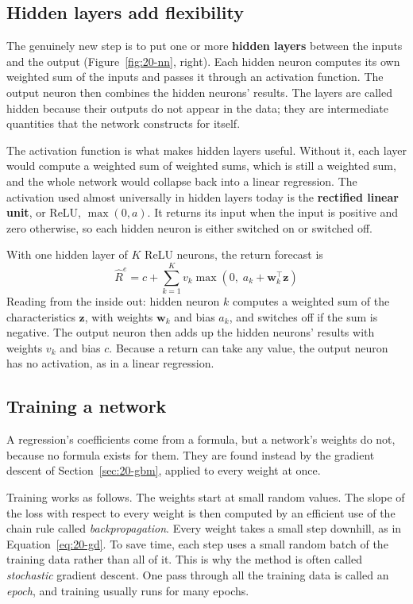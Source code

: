 \subsection{Hidden layers add flexibility}

The genuinely new step is to put one or more \textbf{hidden layers} between the inputs and the output (Figure~\ref{fig:20-nn}, right). Each hidden neuron computes its own weighted sum of the inputs and passes it through an activation function. The output neuron then combines the hidden neurons' results. The layers are called hidden because their outputs do not appear in the data; they are intermediate quantities that the network constructs for itself.

The activation function is what makes hidden layers useful. Without it, each layer would compute a weighted sum of weighted sums, which is still a weighted sum, and the whole network would collapse back into a linear regression. The activation used almost universally in hidden layers today is the \textbf{rectified linear unit}, or ReLU, $\max(0, a)$. It returns its input when the input is positive and zero otherwise, so each hidden neuron is either switched on or switched off.

With one hidden layer of $K$ ReLU neurons, the return forecast is
\begin{equation}
  \hat{R}^{e} = c + \sum_{k=1}^{K} v_k \max\!\left(0,\; a_k + \mathbf{w}_k^{\top}\mathbf{z}\right)
  \label{eq:20-nn}
\end{equation}
Reading from the inside out: hidden neuron $k$ computes a weighted sum of the characteristics $\mathbf{z}$, with weights $\mathbf{w}_k$ and bias $a_k$, and switches off if the sum is negative. The output neuron then adds up the hidden neurons' results with weights $v_k$ and bias $c$. Because a return can take any value, the output neuron has no activation, as in a linear regression.

\subsection{Training a network}

A regression's coefficients come from a formula, but a network's weights do not, because no formula exists for them. They are found instead by the gradient descent of Section~\ref{sec:20-gbm}, applied to every weight at once.

Training works as follows. The weights start at small random values. The slope of the loss with respect to every weight is then computed by an efficient use of the chain rule called \emph{backpropagation}. Every weight takes a small step downhill, as in Equation~\eqref{eq:20-gd}. To save time, each step uses a small random batch of the training data rather than all of it. This is why the method is often called \emph{stochastic} gradient descent. One pass through all the training data is called an \emph{epoch}, and training usually runs for many epochs.

